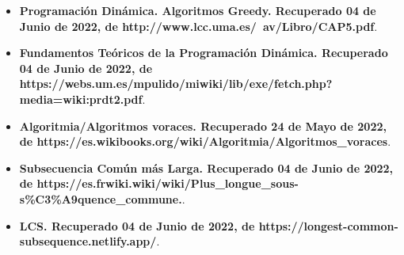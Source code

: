 \documentclass[12pt,twoside]{article}
\begin{document}
\begin{itemize}
    \item \textbf{Programaci\'on Din\'amica. Algoritmos Greedy. Recuperado 04 de Junio de 2022, de http://www.lcc.uma.es/~av/Libro/CAP5.pdf}.
    
    \item \textbf{Fundamentos Te\'oricos de la Programaci\'on Din\'amica. Recuperado 04 de Junio de 2022, de https://webs.um.es/mpulido/miwiki/lib/exe/fetch.php?media=wiki:prdt2.pdf}.
    
    \item \textbf{Algoritmia/Algoritmos voraces. Recuperado 24 de Mayo de 2022, de https://es.wikibooks.org/wiki/Algoritmia/Algoritmos_voraces}.
    
    \item\textbf{Subsecuencia Com\'un m\'as Larga. Recuperado 04 de Junio de 2022, de https://es.frwiki.wiki/wiki/Plus_longue_sous-s\%C3\%A9quence_commune.}.
    
    \item\textbf{LCS. Recuperado 04 de Junio de 2022, de https://longest-common-subsequence.netlify.app/}.
    
\end{itemize}

\medskip
\end{document}
